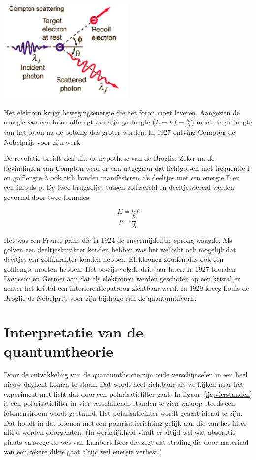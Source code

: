 \documentclass[../main.tex]{subfiles}
\begin{document}
\begin{center}
\leavevmode
\includegraphics[width=0.5\textwidth]{./img/compton.png}
\end{center}

Het elektron krijgt bewegingsenergie die het foton moet leveren. Aangezien de energie van een foton afhangt van zijn golflengte ($E=hf=\tfrac{hc}{\lambda}$) moet de golflengte van het foton na de botsing dus groter worden. In 1927 ontving Compton de Nobelprijs voor zijn werk.

De revolutie breidt zich uit: de hypothese van de Broglie.
Zeker na de bevindingen van Compton werd er van uitgegaan dat lichtgolven met frequentie f en golflengte $\lambda$ ook zich konden manifesteren als deeltjes met een energie E en een impuls p. De twee bruggetjes tussen golfwereld en deeltjeswereld werden gevormd door twee formules:

$$E=hf$$
$$p=\frac{h}{\lambda}$$

Het was een Franse prins die in 1924 de onvermijdelijke sprong waagde. Als golven een deeltjeskarakter konden hebben was het wellicht ook mogelijk dat deeltjes een golfkarakter konden hebben. Elektronen zouden dus ook een golflengte moeten hebben.
Het bewijs volgde drie jaar later. In 1927 toonden Davisson en Germer aan dat als elektronen werden geschoten op een kristal er achter het kristal een interferentiepatroon zichtbaar werd. In 1929 kreeg Louis de Broglie de Nobelprijs voor zijn bijdrage aan de quantumtheorie.

\section{Interpretatie van de quantumtheorie}
Door de ontwikkeling van de quantumtheorie zijn oude verschijnselen in een heel nieuw daglicht komen te staan. Dat wordt heel zichtbaar als we kijken naar het experiment met licht dat door een polarisatiefilter gaat. 
In figuur~\ref{fig:vierstanden} is een polarisatiefilter in vier verschillende standen te zien waarop steeds een fotonenstroom wordt gestuurd. Het polarisatiefilter wordt geacht ideaal te zijn. Dat houdt in dat fotonen met een polarisatierichting gelijk aan die van het filter altijd worden doorgelaten. (In werkelijkheid vindt er altijd wel wat absorptie plaats vanwege de wet van Lambert-Beer die zegt dat straling die door materiaal van een zekere dikte gaat altijd wel energie verliest.)
\end{document}
